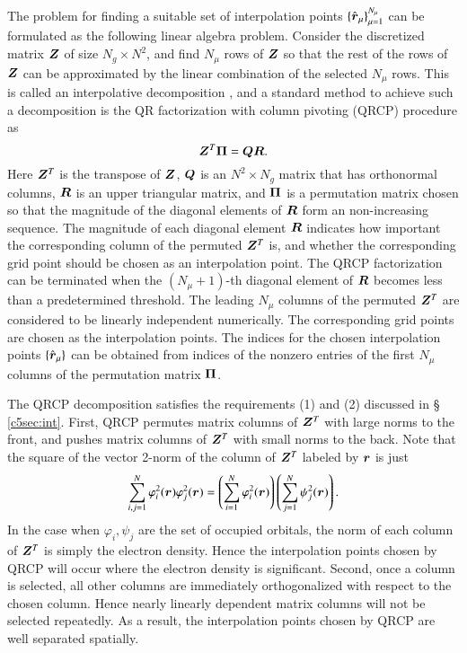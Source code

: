The problem for finding a suitable set of interpolation points $\{\smash{\hat{\bm{r}}}_\mu\}_
{\mu=1}^{N_{\mu}}$ can be formulated as the following linear algebra problem.
Consider the discretized matrix $\bm{Z}$ of size $N_{g}\times N^2$, and find $N_
{\mu}$ rows of $\bm{Z}$ so that the rest of the rows of $\bm{Z}$ can be approximated
by the linear combination of the selected $N_{\mu}$ rows. This is called an
interpolative decomposition \cite{SIAM_13_727_1992_QRCP}, and a standard method
to achieve such a decomposition is the QR factorization with column pivoting 
(QRCP) procedure \cite{SIAM_13_727_1992_QRCP} as
\begin{equation}\label{eqn:QRCP}
  \bm{Z}^{T} \bm{\Pi} = \bm{Q}\bm{R}.
\end{equation}
Here $\bm{Z}^T$ is the transpose of $\bm{Z}$, $\bm{Q}$ is an $N^2 \times N_g$ matrix that
has orthonormal columns, $\bm{R}$ is an upper triangular matrix, and $\bm{\Pi}$ is a
permutation matrix chosen so that the magnitude of the diagonal elements of
$\bm{R}$ form an non-increasing sequence.  The magnitude of each diagonal element
$\bm{R}$ indicates how important the corresponding column of the permuted $\bm{Z}^T$
is, and whether the corresponding grid point should be chosen as an
interpolation point. The QRCP factorization can be terminated when the $(N_
{\mu}+1)$-th diagonal element of $\bm{R}$ becomes less than a predetermined
threshold. The leading $N_{\mu}$ columns of the permuted $\bm{Z}^T$ are considered
to be linearly independent numerically. The corresponding grid points are chosen
as the interpolation points. The indices for the chosen interpolation points $
\{\smash{\hat{\bm{r}}}_\mu\}$ can be obtained from indices of the nonzero entries of the first
$N_{\mu}$ columns of the permutation matrix $\bm{\Pi}$.

The QRCP decomposition satisfies the requirements (1) and (2) discussed in \S
\ref{c5sec:int}. First, QRCP permutes matrix columns of $\bm{Z}^{T}$ with large
norms to the front, and pushes matrix columns of $\bm{Z}^{T}$ with small norms to
the back. Note that the square of the vector 2\hyp{}norm of the column of $\bm{Z}^
{T}$ labeled by $\bm{r}$ is just
\begin{equation}\label{eqn:Znorm}
  \sum_{i,j=1}^{N} \varphi_{i}^2(\bm{r}) \varphi_{j}^2(\bm{r}) =
  \left(\sum_{i=1}^{N} \varphi_{i}^2(\bm{r})\right) \left(\sum_{j=1}^{N}
  \psi_{j}^2(\bm{r})\right).
\end{equation}
In the case when $\varphi_{i},\psi_{j}$ are the set of occupied orbitals, the
norm of each column of $\bm{Z}^{T}$ is simply the electron density. Hence the
interpolation points chosen by QRCP will occur where the electron density is
significant. Second, once a column is selected, all other columns are
immediately orthogonalized with respect to the chosen column. Hence nearly
linearly dependent matrix columns will not be selected repeatedly. As a result,
the interpolation points chosen by QRCP are well separated spatially.

